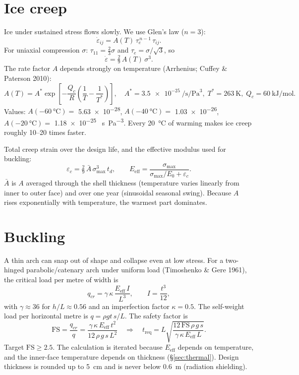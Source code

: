 \documentclass[11pt,a4paper]{article}
\begin{document}
\section{Ice creep}
Ice under sustained stress flows slowly. We use Glen's law ($n=3$):
\begin{equation}
\dot\varepsilon_{ij}=A(T)\,\tau_e^{\,n-1}\,\tau_{ij}.
\end{equation}
For uniaxial compression $\sigma$: $\tau_{11}=\tfrac23\sigma$ and $\tau_e=\sigma/\sqrt3$, so
\begin{equation}
\dot\varepsilon=\tfrac{2}{9}\,A(T)\,\sigma^{3}.
\end{equation}
The rate factor $A$ depends strongly on temperature (Arrhenius; Cuffey \& Paterson 2010):
\begin{equation}
A(T)=A^\ast\exp\!\left[-\frac{Q_c}{R}\left(\frac1T-\frac1{T^\ast}\right)\right],\quad
A^\ast=\SI{3.5e-25}{\per\second\per\pascal\cubed},\; T^\ast=\SI{263}{\kelvin},\; Q_c=\SI{60}{\kilo\joule\per\mole}.
\end{equation}
Values: $A(\SI{-60}{\celsius})=$ \num{5.63e-28}, $A(\SI{-40}{\celsius})=$ \num{1.03e-26}, $A(\SI{-20}{\celsius})=$ \num{1.18e-25} \si{\per\second\per\pascal\cubed}. Every \SI{20}{\celsius} of warming makes ice creep roughly 10--20 times faster.

Total creep strain over the design life, and the effective modulus used for buckling:
\begin{equation}
\varepsilon_c=\tfrac29\,\bar A\,\sigma_{\max}^3\,t_d,\qquad
E_{\text{eff}}=\frac{\sigma_{\max}}{\sigma_{\max}/E_0+\varepsilon_c}.
\end{equation}
$\bar A$ is $A$ averaged through the shell thickness (temperature varies linearly from inner to outer face) and over one year (sinusoidal seasonal swing). Because $A$ rises exponentially with temperature, the warmest part dominates.

\section{Buckling}
A thin arch can snap out of shape and collapse even at low stress. For a two-hinged parabolic/catenary arch under uniform load (Timoshenko \& Gere 1961), the critical load per metre of width is
\begin{equation}
q_{cr}=\gamma\,\kappa\,\frac{E_{\text{eff}}\,I}{L^3},\qquad I=\frac{t^3}{12},
\end{equation}
with $\gamma\approx36$ for $h/L\approx0.56$ and an imperfection factor $\kappa=0.5$. The self-weight load per horizontal metre is $q=\rho g t\,s/L$. The safety factor is
\begin{equation}
\mathrm{FS}=\frac{q_{cr}}{q}=\frac{\gamma\,\kappa\,E_{\text{eff}}\,t^{2}}{12\,\rho\, g\, s\, L^{2}}
\quad\Longrightarrow\quad
t_{\text{req}}=L\sqrt{\frac{12\,\mathrm{FS}\,\rho\, g\, s}{\gamma\,\kappa\,E_{\text{eff}}\,L}} .
\end{equation}
Target $\mathrm{FS}\ge2.5$. The calculation is iterated because $E_{\text{eff}}$ depends on temperature, and the inner-face temperature depends on thickness (\S\ref{sec:thermal}). Design thickness is rounded up to \SI{5}{\centi\metre} and is never below \SI{0.6}{\metre} (radiation shielding).
\end{document}
